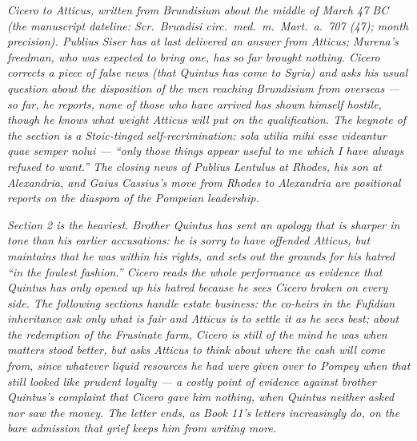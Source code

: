 
\textit{Cicero to Atticus, written from Brundisium about
the middle of March 47 BC (the manuscript dateline:
\textit{Scr.\ Brundisi circ.\ med.\ m.\ Mart.\ a.\ 707
(47)}; month precision). Publius Siser has at last
delivered an answer from Atticus; Murena's freedman, who
was expected to bring one, has so far brought nothing.
Cicero corrects a piece of false news (that Quintus has
come to Syria) and asks his usual question about the
disposition of the men reaching Brundisium from
overseas --- so far, he reports, none of those who have
arrived has shown himself hostile, though he knows what
weight Atticus will put on the qualification. The
keynote of the section is a Stoic-tinged
self-recrimination: \textit{sola utilia mihi esse
videantur quae semper nolui} --- ``only those things
appear useful to me which I have always refused to want.''
The closing news of Publius Lentulus at Rhodes, his son at
Alexandria, and Gaius Cassius's move from Rhodes to
Alexandria are positional reports on the diaspora of
the Pompeian leadership.}

\textit{Section 2 is the heaviest. Brother Quintus has
sent an apology that is sharper in tone than his
earlier accusations: he is sorry to have offended
Atticus, but maintains that he was within his rights,
and sets out the grounds for his hatred ``in the
foulest fashion.'' Cicero reads the whole performance
as evidence that Quintus has only opened up his hatred
because he sees Cicero broken on every side. The
following sections handle estate business: the
co-heirs in the Fufidian inheritance ask only what is
fair and Atticus is to settle it as he sees best; about
the redemption of the Frusinate farm, Cicero is still
of the mind he was when matters stood better, but
asks Atticus to think about where the cash will come
from, since whatever liquid resources he had were
given over to Pompey when that still looked like
prudent loyalty --- a costly point of evidence against
brother Quintus's complaint that Cicero gave him
nothing, when Quintus neither asked nor saw the money.
The letter ends, as Book 11's letters increasingly do,
on the bare admission that grief keeps him from
writing more.}
